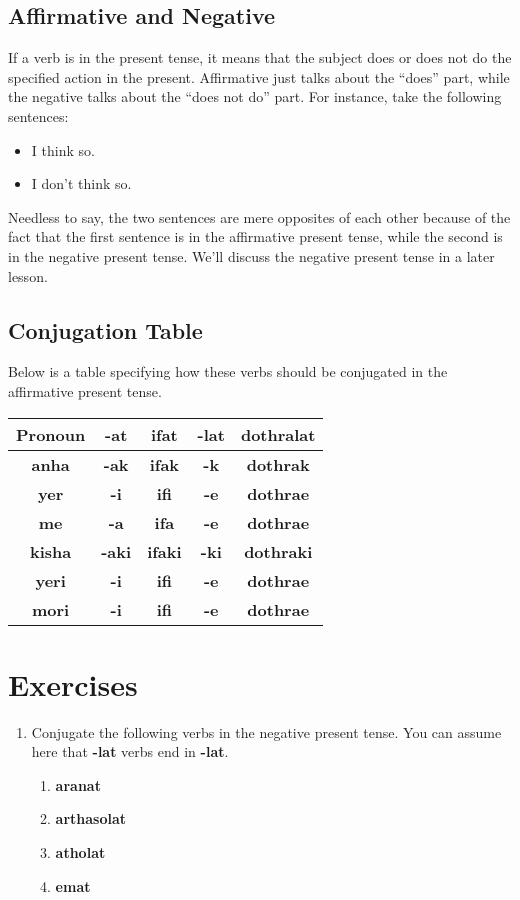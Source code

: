 \subsection*{Affirmative and Negative}
If a verb is in the present tense, it means that the subject does or does not do the specified action in the present.
Affirmative just talks about the ``does'' part, while the negative talks about the ``does not do'' part. For instance,
take the following sentences:
\begin{itemize}
	\item I think so.
	\item I don't think so.
\end{itemize}
Needless to say, the two sentences are mere opposites of each other because of the fact that the first sentence is in
the affirmative present tense, while the second is in the negative present tense. We'll discuss the negative present
tense in a later lesson.
\subsection*{Conjugation Table}
Below is a table specifying how these verbs should be conjugated in the affirmative present tense. \\
\begin{tabular}{|c|c|c|c|c|}
		\hline
		Pronoun & \textbf{-at} & \textbf{ifat} & \textbf{-lat} & \textbf{dothralat} \\
		\hline
		\textbf{anha} & \textbf{-ak} & \textbf{ifak} & \textbf{-k} & \textbf{dothrak} \\
		\hline
		\textbf{yer} & \textbf{-i} & \textbf{ifi} & \textbf{-e} & \textbf{dothrae} \\
		\hline
		\textbf{me} & \textbf{-a} & \textbf{ifa} & \textbf{-e} & \textbf{dothrae} \\
		\hline
		\textbf{kisha} & \textbf{-aki} & \textbf{ifaki} & \textbf{-ki} & \textbf{dothraki} \\
		\hline
		\textbf{yeri} & \textbf{-i} & \textbf{ifi} & \textbf{-e} & \textbf{dothrae} \\
		\hline
		\textbf{mori} & \textbf{-i} & \textbf{ifi} & \textbf{-e} & \textbf{dothrae} \\
		\hline
\end{tabular}
\section*{Exercises}
\begin{enumerate}
	\item Conjugate the following verbs in the negative present tense. You can assume here that
\textbf{-lat} verbs end in \textbf{-lat}.
	\begin{enumerate}
		\item \textbf{aranat}
		\item \textbf{arthasolat}
		\item \textbf{atholat}
		\item \textbf{emat}
	\end{enumerate}
\end{enumerate}
